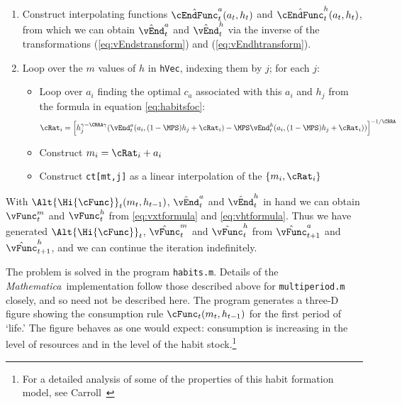 \documentclass[titlepage]{\econtex}
\newcommand{\Mma}{\textit{Mathematica}}
\begin{document}
{\begin{enumerate}
  \item Construct interpolating functions $\hat{\cEndFunc}^{a}_{t}({a}_{t},h_{t})$
    and $\hat{\cEndFunc}^{h}_{t}({a}_{t},h_{t})$, from which we can
    obtain $\hat{\vEnd}^{a}_{t}$ and $\hat{\vEnd}^{h}_{t}$
    via the inverse of the transformations (\ref{eq:vEndstransform})
    and (\ref{eq:vEndhtransform}).

  \item Loop over the $m$ values of $h$ in \texttt{hVec}, indexing them
    by $j$; for each $j$:
    \begin{itemize}
    \item Loop over ${a}_{i}$ finding the optimal ${c}_{a}$ associated
      with this ${a}_{i}$ and $h_{j}$ from the formula in equation
      \eqref{eq:habitsfoc}:
      \begin{equation}
        {\cRat}_{i} = \left[h_{j}^{\gamma-\CRRA \gamma}
          (\vEnd_{t}^{{a}}({a}_{i},(1-\MPS) h_{j}+ {\cRat}_{i})
          -\MPS \vEnd_{t}^{h}({a}_{i},(1-\MPS)
          h_{j}+{\cRat}_{i}))\right]^{-1/\CRRA} \nonumber
      \end{equation}

    \item Construct ${m}_{i} = {\cRat}_{i}+{a}_{i}$

    \item Construct \texttt{ct[mt,j]} as a linear interpolation of the
      $\{{m}_{i},{\cRat}_{i}\}$
    \end{itemize}
  \end{enumerate}

  With $\Alt{\Hi{\cFunc}}_{t}({m}_{t},h_{t-1})$, $\hat{\vEnd}_{t}^{{a}}$
  and $\hat{\vEnd}_{t}^{h}$ in hand we can obtain ${\vFunc}^{m}_{t}$
  and ${\vFunc}^{h}_{t}$ from \eqref{eq:vxtformula} and
  \eqref{eq:vhtformula}. Thus we have generated $\Alt{\Hi{\cFunc}}_{t}$,
  $\hat{\vFunc}^{m}_{t}$ and $\hat{\vFunc}^{h}_{t}$ from $\hat{\vFunc}^{a}_{t+1}$ and
  $\hat{\vFunc}^{h}_{t+1}$, and we can continue the iteration indefinitely.

  The problem is solved in the program \texttt{habits.m}.  Details of
  the {\Mma}~implementation follow those described above for
  \texttt{multiperiod.m} closely, and so need not be described here.
  The program generates a three-D figure showing the consumption rule
  $\cFunc_{t}({m}_{t},h_{t-1})$ for the first period of `life.'  The figure
  behaves as one would expect: consumption is increasing in the level
  of resources and in the level of the habit stock.\footnote{For a
    detailed analysis of some of the properties of this habit formation
    model, see Carroll~\citeyearpar{carroll:RiskyHabits}}


}{}
\end{document}
